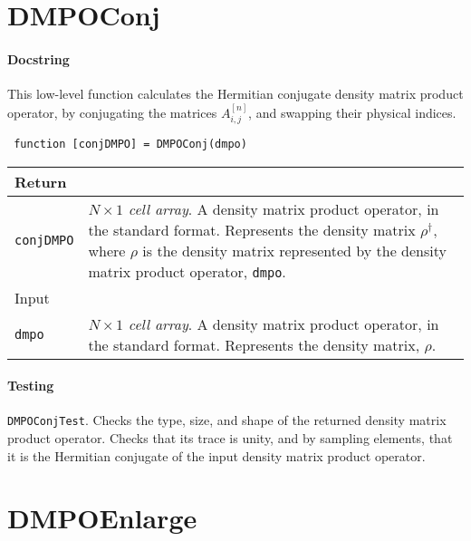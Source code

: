  \section{DMPOConj}
 \paragraph{Docstring} This low-level function calculates the Hermitian conjugate density matrix product operator, by conjugating the matrices \(A^{[n]}_{i,j}\), and swapping their physical indices.
 \begin{lstlisting}
 function [conjDMPO] = DMPOConj(dmpo) \end{lstlisting}
 \begin{longtabu}{X[1,l]X[4,l]}
 \hline
 Return & \\ \hline
 \lstinline$conjDMPO$ & \emph{\(N \times 1\) cell array}. A density matrix product operator, in the standard format. Represents the density matrix \(\rho^{\dagger}\), where \(\rho\) is the density matrix represented by the density matrix product operator, \lstinline$dmpo$. \\ \hline
 Input & \\ \hline
 \lstinline$dmpo$ & \emph{\(N \times 1\) cell array}. A density matrix product operator, in the standard format. Represents the density matrix, \(\rho\). \\
 \hline
 \end{longtabu}
 \paragraph{Testing} \lstinline$DMPOConjTest$. Checks the type, size, and shape of the returned density matrix product operator. Checks that its trace is unity, and by sampling elements, that it is the Hermitian conjugate of the input density matrix product operator.

 \section{DMPOEnlarge}

